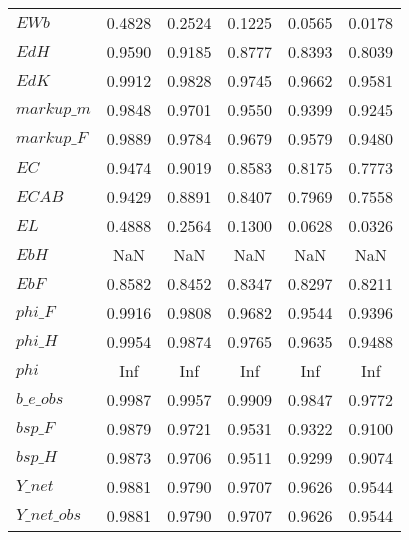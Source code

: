 \begin{center}
\begin{longtable}{lccccc}
$EWb                        $	 & 	    0.4828	 & 	    0.2524	 & 	    0.1225	 & 	    0.0565	 & 	    0.0178 \\ 
$EdH                        $	 & 	    0.9590	 & 	    0.9185	 & 	    0.8777	 & 	    0.8393	 & 	    0.8039 \\ 
$EdK                        $	 & 	    0.9912	 & 	    0.9828	 & 	    0.9745	 & 	    0.9662	 & 	    0.9581 \\ 
$markup\_m                  $	 & 	    0.9848	 & 	    0.9701	 & 	    0.9550	 & 	    0.9399	 & 	    0.9245 \\ 
$markup\_F                  $	 & 	    0.9889	 & 	    0.9784	 & 	    0.9679	 & 	    0.9579	 & 	    0.9480 \\ 
$EC                         $	 & 	    0.9474	 & 	    0.9019	 & 	    0.8583	 & 	    0.8175	 & 	    0.7773 \\ 
$ECAB                       $	 & 	    0.9429	 & 	    0.8891	 & 	    0.8407	 & 	    0.7969	 & 	    0.7558 \\ 
$EL                         $	 & 	    0.4888	 & 	    0.2564	 & 	    0.1300	 & 	    0.0628	 & 	    0.0326 \\ 
$EbH                        $	 & 	       NaN	 & 	       NaN	 & 	       NaN	 & 	       NaN	 & 	       NaN \\ 
$EbF                        $	 & 	    0.8582	 & 	    0.8452	 & 	    0.8347	 & 	    0.8297	 & 	    0.8211 \\ 
$phi\_F                     $	 & 	    0.9916	 & 	    0.9808	 & 	    0.9682	 & 	    0.9544	 & 	    0.9396 \\ 
$phi\_H                     $	 & 	    0.9954	 & 	    0.9874	 & 	    0.9765	 & 	    0.9635	 & 	    0.9488 \\ 
$phi                        $	 & 	       Inf	 & 	       Inf	 & 	       Inf	 & 	       Inf	 & 	       Inf \\ 
$b\_e\_obs                  $	 & 	    0.9987	 & 	    0.9957	 & 	    0.9909	 & 	    0.9847	 & 	    0.9772 \\ 
$bsp\_F                     $	 & 	    0.9879	 & 	    0.9721	 & 	    0.9531	 & 	    0.9322	 & 	    0.9100 \\ 
$bsp\_H                     $	 & 	    0.9873	 & 	    0.9706	 & 	    0.9511	 & 	    0.9299	 & 	    0.9074 \\ 
$Y\_net                     $	 & 	    0.9881	 & 	    0.9790	 & 	    0.9707	 & 	    0.9626	 & 	    0.9544 \\ 
$Y\_net\_obs                $	 & 	    0.9881	 & 	    0.9790	 & 	    0.9707	 & 	    0.9626	 & 	    0.9544 \\ 

\end{longtable}
\end{center}
